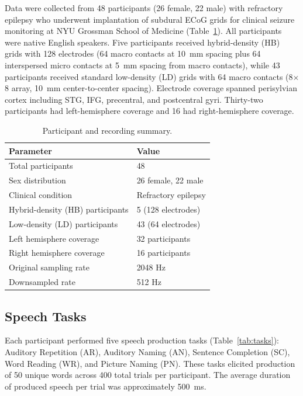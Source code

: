 \documentclass[11pt]{article}
\begin{document}
Data were collected from 48 participants (26 female, 22 male) with refractory epilepsy who underwent implantation of subdural ECoG grids for clinical seizure monitoring at NYU Grossman School of Medicine (Table~\ref{tab:participants}). All participants were native English speakers. Five participants received hybrid-density (HB) grids with 128 electrodes (64 macro contacts at 10~mm spacing plus 64 interspersed micro contacts at 5~mm spacing from macro contacts), while 43 participants received standard low-density (LD) grids with 64 macro contacts (8$\times$8 array, 10~mm center-to-center spacing). Electrode coverage spanned perisylvian cortex including STG, IFG, precentral, and postcentral gyri. Thirty-two participants had left-hemisphere coverage and 16 had right-hemisphere coverage.

\begin{table}[htbp]
\centering
\caption{Participant and recording summary.}
\label{tab:participants}
\begin{tabular}{ll}
\toprule
\textbf{Parameter} & \textbf{Value} \\
\midrule
Total participants & 48 \\
Sex distribution & 26 female, 22 male \\
Clinical condition & Refractory epilepsy \\
Hybrid-density (HB) participants & 5 (128 electrodes) \\
Low-density (LD) participants & 43 (64 electrodes) \\
Left hemisphere coverage & 32 participants \\
Right hemisphere coverage & 16 participants \\
Original sampling rate & 2048 Hz \\
Downsampled rate & 512 Hz \\
\bottomrule
\end{tabular}
\end{table}

\subsection{Speech Tasks}

Each participant performed five speech production tasks (Table~\ref{tab:tasks}): Auditory Repetition (AR), Auditory Naming (AN), Sentence Completion (SC), Word Reading (WR), and Picture Naming (PN). These tasks elicited production of 50 unique words across 400 total trials per participant. The average duration of produced speech per trial was approximately 500~ms.
\end{document}
